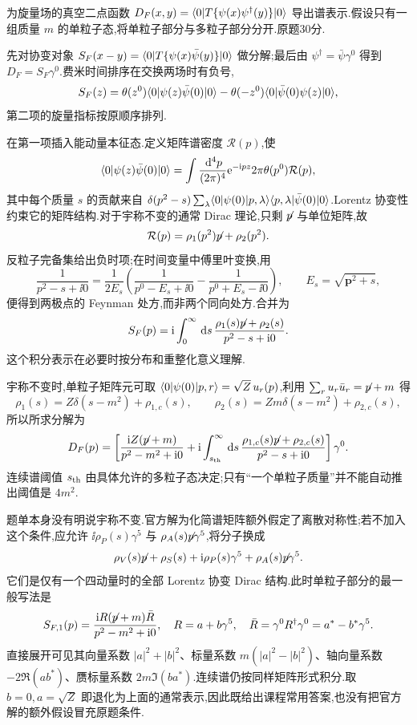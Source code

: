\begin{exercise}
为旋量场的真空二点函数 $D_F(x,y)=\bra0T\{\psi(x)\psi^\dagger(y)\}\ket0$ 导出谱表示.假设只有一组质量 $m$ 的单粒子态,将单粒子部分与多粒子部分分开.原题30分.
\end{exercise}
\begin{solution}
先对协变对象 $S_F(x-y)=\bra0T\{\psi(x)\bar\psi(y)\}\ket0$ 做分解;最后由 $\psi^\dagger=\bar\psi\gamma^0$ 得到 $D_F=S_F\gamma^0$.费米时间排序在交换两场时有负号,
\[
S_F(z)=\theta(z^0)\bra0\psi(z)\bar\psi(0)\ket0
-\theta(-z^0)\bra0\bar\psi(0)\psi(z)\ket0,
\]
第二项的旋量指标按原顺序排列.

在第一项插入能动量本征态.定义矩阵谱密度 $\mathcal R(p)$,使
\[
\bra0\psi(z)\bar\psi(0)\ket0
=\int\frac{\dd^4p}{(2\pi)^4}\e^{-\ii pz}
2\pi\theta(p^0)\mathcal R(p),
\]
其中每个质量 $s$ 的贡献来自
$\delta(p^2-s)\sum_\lambda\bra0\psi(0)\ket{p,\lambda}
\bra{p,\lambda}\bar\psi(0)\ket0$.Lorentz 协变性约束它的矩阵结构.对于宇称不变的通常 Dirac 理论,只剩 $\slashed p$ 与单位矩阵,故
\[
\mathcal R(p)=\rho_1(p^2)\slashed p+\rho_2(p^2).
\]
反粒子完备集给出负时项;在时间变量中傅里叶变换,用
\[
\frac1{p^2-s+\ii0}
=\frac1{2E_s}\left(\frac1{p^0-E_s+\ii0}
-\frac1{p^0+E_s-\ii0}\right),
\qquad E_s=\sqrt{\mathbf p^2+s},
\]
便得到两极点的 Feynman 处方,而非两个同向处方.合并为
\[
S_F(p)=\ii\int_0^\infty\dd s\,
\frac{\rho_1(s)\slashed p+\rho_2(s)}{p^2-s+\ii0}.
\]
这个积分表示在必要时按分布和重整化意义理解.

宇称不变时,单粒子矩阵元可取 $\bra0\psi(0)\ket{p,r}=\sqrt Z\,u_r(p)$,利用 $\sum_r u_r\bar u_r=\slashed p+m$ 得
\[
\rho_1(s)=Z\delta(s-m^2)+\rho_{1,c}(s),
\qquad \rho_2(s)=Zm\delta(s-m^2)+\rho_{2,c}(s),
\]
所以所求分解为
\[
D_F(p)=\left[
\frac{\ii Z(\slashed p+m)}{p^2-m^2+\ii0}
+\ii\int_{s_{\rm th}}^\infty\dd s\,
\frac{\rho_{1,c}(s)\slashed p+\rho_{2,c}(s)}{p^2-s+\ii0}
\right]\gamma^0.
\]
连续谱阈值 $s_{\rm th}$ 由具体允许的多粒子态决定;只有“一个单粒子质量”并不能自动推出阈值是 $4m^2$.

题单本身没有明说宇称不变.官方解为化简谱矩阵额外假定了离散对称性;若不加入这个条件,应允许 $\ii\rho_P(s)\gamma^5$ 与 $\rho_A(s)\slashed p\gamma^5$,将分子换成
\[
\rho_V(s)\slashed p+\rho_S(s)
+\ii\rho_P(s)\gamma^5+\rho_A(s)\slashed p\gamma^5.
\]
它们是仅有一个四动量时的全部 Lorentz 协变 Dirac 结构.此时单粒子部分的最一般写法是
\[
S_{F,1}(p)=\frac{\ii R(\slashed p+m)\bar R}{p^2-m^2+\ii0},
\quad R=a+b\gamma^5,\quad
\bar R=\gamma^0R^\dagger\gamma^0=a^*-b^*\gamma^5.
\]
直接展开可见其向量系数 $|a|^2+|b|^2$、标量系数 $m(|a|^2-|b|^2)$、轴向量系数 $-2\Re(ab^*)$、赝标量系数 $2m\Im(ba^*)$.连续谱仍按同样矩阵形式积分.取 $b=0,a=\sqrt Z$ 即退化为上面的通常表示,因此既给出课程常用答案,也没有把官方解的额外假设冒充原题条件.
\end{solution}


